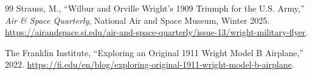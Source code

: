 \begin{thebibliography}{99}
 Strauss, M., ``Wilbur and Orville Wright's 1909 Triumph for the U.S. Army,'' \emph{Air \& Space Quarterly}, National Air and Space Museum, Winter 2025. \url{https://airandspace.si.edu/air-and-space-quarterly/issue-13/wright-military-flyer}.

 The Franklin Institute, ``Exploring an Original 1911 Wright Model B Airplane,'' 2022. \url{https://fi.edu/en/blog/exploring-original-1911-wright-model-b-airplane}.
\end{thebibliography}
